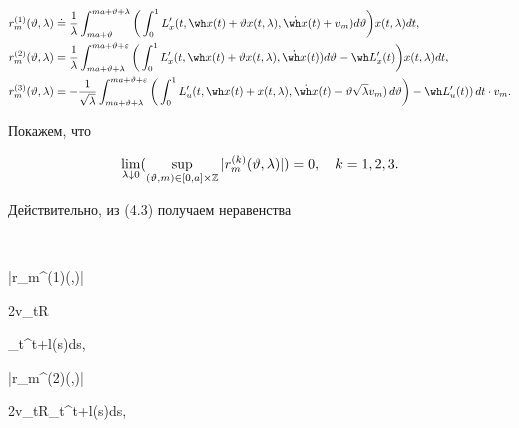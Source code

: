 \begin{align*}


r_m^{(1)}(\vartheta,\lambda)&\doteq \frac{1}{\lambda}


\int_{ma+\vartheta}^{ma+\vartheta+\lambda}


\bigg(\int_0^1 L_x'(t,\wh x(t)+\vartheta x(t,\lambda),


\Dot{\wh x}(t)+v_m)d\vartheta\bigg)x(t,\lambda)dt, \\


r_m^{(2)}(\vartheta,\lambda)&=\frac{1}{\lambda}


\int_{ma+\vartheta+\lambda}^{ma+\vartheta+\varepsilon}


\bigg(\int_0^1 L_x'(t,\wh x(t)+\vartheta x(t,\lambda),\Dot{\wh


x}(t))d\vartheta-\wh L_x'(t)\bigg)x(t,\lambda)dt, \\


r_m^{(3)}(\vartheta,\lambda)&=-\frac{1}{\sqrt{\lambda}}


\int_{ma+\vartheta+\lambda}^{ma+\vartheta+\varepsilon}


\bigg(\int_0^1 L_u'(t,\wh x(t)+x(t,\lambda),\Dot{\wh x}(t)-


\vartheta\sqrt{\lambda}v_m)\,d\vartheta\bigg)-


\wh L_u'(t))\,dt \cdot v_m.


\end{align*}





Покажем, что


\begin{equation}


\lim_{\lambda\downarrow


0}(\sup_{(\vartheta,m)\in[0,a]\times\Bbb


Z}|r_m^{(k)}(\vartheta,\lambda)|)=0,\quad k=1, 2, 3.


\end{equation}





Действительно, из (4.3) получаем неравенства


$$


|r_m^{(1)}(\vartheta,\lambda)|\leqslant


2v\sup_{t\in\Bbb R}


\int_t^{t+\sqrt{\lambda}}\frak l(s)ds,


\quad |r_m^{(2)}(\vartheta,\lambda)|\leqslant


2v\sup_{t\in\Bbb R}\int_t^{t+\sqrt{\lambda}}\frak l(s)ds,


